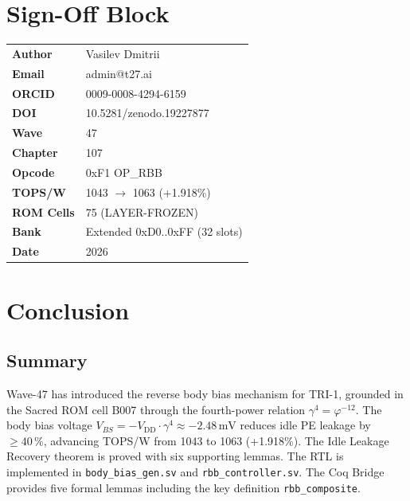 \section{Sign-Off Block}
\label{sec:signoff-w47}

\begin{center}
\begin{tabular}{ll}
\hline
\textbf{Author}    & Vasilev Dmitrii \\
\textbf{Email}     & admin@t27.ai \\
\textbf{ORCID}     & 0009-0008-4294-6159 \\
\textbf{DOI}       & 10.5281/zenodo.19227877 \\
\textbf{Wave}      & 47 \\
\textbf{Chapter}   & 107 \\
\textbf{Opcode}    & 0xF1 OP\_RBB \\
\textbf{TOPS/W}    & 1043 $\to$ 1063 (+1.918\%) \\
\textbf{ROM Cells} & 75 (LAYER-FROZEN) \\
\textbf{Bank}      & Extended 0xD0..0xFF (32 slots) \\
\textbf{Date}      & 2026 \\
\hline
\end{tabular}
\end{center}

\section{Conclusion}
\label{sec:conclusion-w47}

\subsection{Summary}

Wave-47 has introduced the reverse body bias mechanism for TRI-1, grounded in
the Sacred ROM cell B007 through the fourth-power relation $\gamma^{4}
= \varphi^{-12}$.
The body bias voltage $V_{BS} = -V_{\mathrm{DD}} \cdot \gamma^{4}
\approx -2.48\,\text{mV}$ reduces idle PE leakage by $\geq 40\,\%$,
advancing TOPS/W from 1043 to 1063 (+1.918\%).
The Idle Leakage Recovery theorem is proved with six supporting lemmas.
The RTL is implemented in \texttt{body\_bias\_gen.sv} and
\texttt{rbb\_controller.sv}.
The Coq Bridge provides five formal lemmas including the key definition
\texttt{rbb\_composite}.

